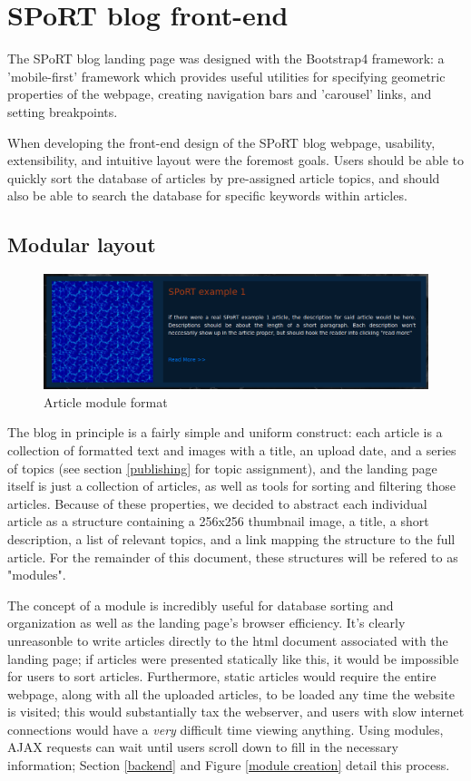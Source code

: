 \documentclass[12pt]{article}
\begin{document}
\newpage
\section{SPoRT blog front-end}
\label{frontend}

The SPoRT blog landing page was designed with the Bootstrap4 framework: a 'mobile-first' framework which provides useful utilities for specifying geometric properties of the webpage, creating navigation bars and 'carousel' links, and setting breakpoints.

When developing the front-end design of the SPoRT blog webpage, usability, extensibility, and intuitive layout were the foremost goals. Users should be able to quickly sort the database of articles by pre-assigned article topics, and should also be able to search the database for specific keywords within articles.

\subsection{Modular layout}
\label{modules}

\begin{figure}[h]
  \centering
  \includegraphics[width=.66\linewidth]{./figures/module.png}
  \caption{Article module format}
  \label{module example} %
\end{figure}

 The blog in principle is a fairly simple and uniform construct: each article is a collection of formatted text and images with a title, an upload date, and a series of topics (see section \ref{publishing} for topic assignment), and the landing page itself is just a collection of articles, as well as tools for sorting and filtering those articles. Because of these properties, we decided to abstract each individual article as a structure containing a 256x256 thumbnail image, a title, a short description, a list of relevant topics, and a link mapping the structure to the full article. For the remainder of this document, these structures will be refered to as "modules".

 The concept of a module is incredibly useful for database sorting and organization as well as the landing page's browser efficiency. It's clearly unreasonble to write articles directly to the html document associated with the landing page; if articles were presented statically like this, it would be impossible for users to sort articles. Furthermore, static articles would require the entire webpage, along with all the uploaded articles, to be loaded any time the website is visited; this would substantially tax the webserver, and users with slow internet connections would have a \textit{very} difficult time viewing anything. Using modules, AJAX requests can wait until users scroll down to fill in the necessary information; Section \ref{backend} and Figure \ref{module creation} detail this process.
\end{document}
